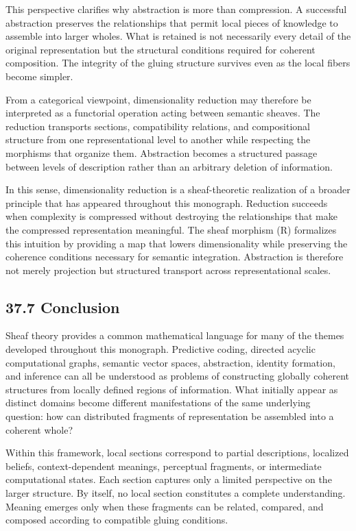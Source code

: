 \documentclass[12pt,letterpaper]{article}
\theoremstyle{remark}
\begin{document}
This perspective clarifies why abstraction is more than compression. A successful abstraction preserves the relationships that permit local pieces of knowledge to assemble into larger wholes. What is retained is not necessarily every detail of the original representation but the structural conditions required for coherent composition. The integrity of the gluing structure survives even as the local fibers become simpler.

From a categorical viewpoint, dimensionality reduction may therefore be interpreted as a functorial operation acting between semantic sheaves. The reduction transports sections, compatibility relations, and compositional structure from one representational level to another while respecting the morphisms that organize them. Abstraction becomes a structured passage between levels of description rather than an arbitrary deletion of information.

In this sense, dimensionality reduction is a sheaf-theoretic realization of a broader principle that has appeared throughout this monograph. Reduction succeeds when complexity is compressed without destroying the relationships that make the compressed representation meaningful. The sheaf morphism (R) formalizes this intuition by providing a map that lowers dimensionality while preserving the coherence conditions necessary for semantic integration. Abstraction is therefore not merely projection but structured transport across representational scales.

\subsection{37.7 Conclusion}

Sheaf theory provides a common mathematical language for many of the themes developed throughout this monograph. Predictive coding, directed acyclic computational graphs, semantic vector spaces, abstraction, identity formation, and inference can all be understood as problems of constructing globally coherent structures from locally defined regions of information. What initially appear as distinct domains become different manifestations of the same underlying question: how can distributed fragments of representation be assembled into a coherent whole?

Within this framework, local sections correspond to partial descriptions, localized beliefs, context-dependent meanings, perceptual fragments, or intermediate computational states. Each section captures only a limited perspective on the larger structure. By itself, no local section constitutes a complete understanding. Meaning emerges only when these fragments can be related, compared, and composed according to compatible gluing conditions.
\end{document}
